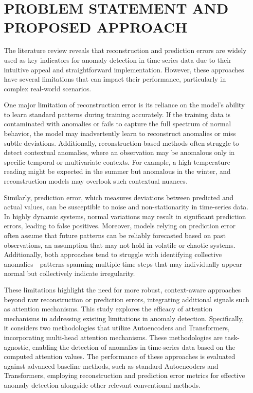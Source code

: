 \documentclass[conference]{IEEEtran}
\begin{document}
\section{PROBLEM STATEMENT AND PROPOSED APPROACH}
\label{sec:approach}

The literature review reveals that reconstruction and prediction errors are widely used as key indicators for anomaly detection in time-series data due to their intuitive appeal and straightforward implementation. However, these approaches have several limitations that can impact their performance, particularly in complex real-world scenarios.

One major limitation of reconstruction error is its reliance on the
model's ability to learn standard patterns during training
accurately. If the training data is contaminated with anomalies or
fails to capture the full spectrum of normal behavior, the model may
inadvertently learn to reconstruct anomalies or miss subtle
deviations. Additionally, reconstruction-based methods often struggle
to detect contextual anomalies, where an observation may be anomalous
only in specific temporal or multivariate contexts. For example, a
high-temperature reading might be expected in the summer but anomalous
in the winter, and reconstruction models may overlook such contextual
nuances.

Similarly, prediction error, which measures deviations between predicted and actual values, can be susceptible to noise and non-stationarity in time-series data. In highly dynamic systems, normal variations may result in significant prediction errors, leading to false positives. Moreover, models relying on prediction error often assume that future patterns can be reliably forecasted based on past observations, an assumption that may not hold in volatile or chaotic systems. Additionally, both approaches tend to struggle with identifying collective anomalies---patterns spanning multiple time steps that may individually appear normal but collectively indicate irregularity.

These limitations highlight the need for more robust, context-aware approaches beyond raw reconstruction or prediction errors, integrating additional signals such as attention mechanisms.
This study explores the efficacy of attention mechanisms in addressing existing limitations in anomaly detection. Specifically, it considers two methodologies that utilize Autoencoders and Transformers, incorporating multi-head attention mechanisms. These methodologies are task-agnostic, enabling the detection of anomalies in time-series data based on the computed attention values. The performance of these approaches is evaluated against advanced baseline methods, such as standard Autoencoders and Transformers, employing reconstruction and prediction error metrics for effective anomaly detection alongside other relevant conventional methods.
\end{document}
